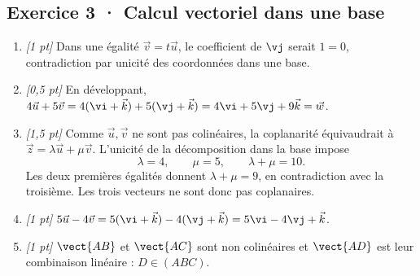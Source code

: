\subsection*{Exercice 3 · Calcul vectoriel dans une base}\begin{enumerate}

\item \textit{[1 pt]} Dans une égalité $\vec v=t\vec u$, le coefficient de $\vj $ serait $1=0$, contradiction par unicité des coordonnées dans une base.

\item \textit{[0,5 pt]} En développant, $4\vec u+5\vec v=4(\vi +\vec k)+5(\vj +\vec k)=4\vi +5\vj +9\vec k=\vec w$.

\item \textit{[1,5 pt]} Comme $\vec u,\vec v$ ne sont pas colinéaires, la coplanarité équivaudrait à $\vec z=\lambda\vec u+\mu\vec v$. L'unicité de la décomposition dans la base impose
\[\lambda=4,\qquad\mu=5,\qquad\lambda+\mu=10.\]
Les deux premières égalités donnent $\lambda+\mu=9$, en contradiction avec la troisième. Les trois vecteurs ne sont donc pas coplanaires.

\item \textit{[1 pt]} $5\vec u-4\vec v=5(\vi +\vec k)-4(\vj +\vec k)=5\vi -4\vj +\vec k$.

\item \textit{[1 pt]} $\vect{AB}$ et $\vect{AC}$ sont non colinéaires et $\vect{AD}$ est leur combinaison linéaire : $D\in(ABC)$.

\end{enumerate}


